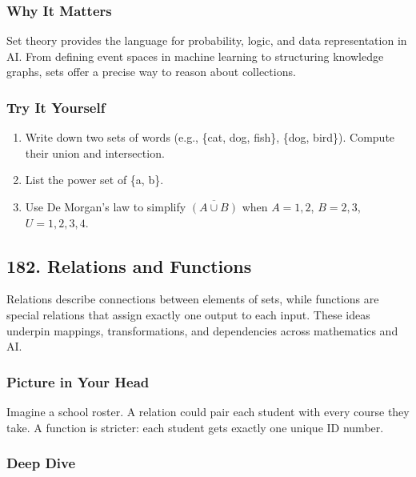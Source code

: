 \documentclass[
  letterpaper,
  DIV=11,
  numbers=noendperiod]{scrreprt}
\providecommand{\tightlist}{%
  \setlength{\itemsep}{0pt}\setlength{\parskip}{0pt}}
\begin{document}
\subsubsection{Why It Matters}\label{why-it-matters-78}

Set theory provides the language for probability, logic, and data
representation in AI. From defining event spaces in machine learning to
structuring knowledge graphs, sets offer a precise way to reason about
collections.

\subsubsection{Try It Yourself}\label{try-it-yourself-180}

\begin{enumerate}
\def\labelenumi{\arabic{enumi}.}
\tightlist
\item
  Write down two sets of words (e.g., \{cat, dog, fish\}, \{dog,
  bird\}). Compute their union and intersection.
\item
  List the power set of \{a, b\}.
\item
  Use De Morgan's law to simplify \(\overline{(A \cup B)}\) when
  \(A={1,2}\), \(B={2,3}\), \(U={1,2,3,4}\).
\end{enumerate}

\subsection{182. Relations and Functions}\label{relations-and-functions}

Relations describe connections between elements of sets, while functions
are special relations that assign exactly one output to each input.
These ideas underpin mappings, transformations, and dependencies across
mathematics and AI.

\subsubsection{Picture in Your Head}\label{picture-in-your-head-181}

Imagine a school roster. A relation could pair each student with every
course they take. A function is stricter: each student gets exactly one
unique ID number.

\subsubsection{Deep Dive}\label{deep-dive-181}
\end{document}
